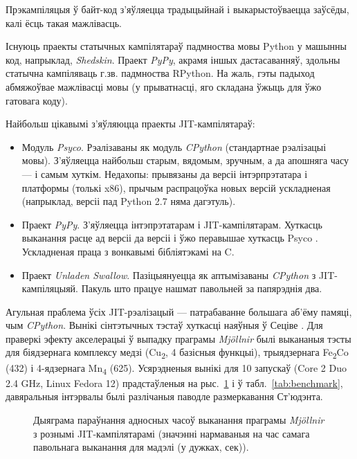 \documentclass[a4paper,12pt]{article}
\newcommand{\progname}{\textit} %
\begin{document}
Прэкампіляцыя ў байт-код з'яўляецца традыцыйнай і выкарыстоўваецца заўсёды, калі ёсць такая мажлівасць.

Існуюць праекты статычных кампілятараў падмноства мовы Python у машынны код, напрыклад, \progname{Shedskin}. Праект \progname{PyPy}, акрамя іншых дастасаванняў, здольны статычна кампіляваць г.зв. падмноства RPython. На жаль, гэты падыход абмяжоўвае мажлівасці мовы (у прыватнасці, яго складана ўжыць для ўжо гатовага коду).

Найбольш цікавымі з'яўляюцца праекты JIT-кампілятараў:
\begin{itemize}
\item Модуль \progname{Psyco}. Рэалізаваны як модуль \progname{CPython} (стандартнае рэалізацыі мовы). З'яўляецца найбольш старым, вядомым, зручным, а да апошняга часу --- і самым хуткім. Недахопы: прывязаны да версіі інтэрпрэтатара і платформы (толькі x86), прычым распрацоўка новых версій ускладненая (напрыклад, версіі пад Python 2.7 няма дагэтуль).

\item Праект \progname{PyPy}. З'яўляецца інтэпрэтатарам і JIT-кампілятарам. Хуткасць выканання расце ад версіі да версіі і ўжо перавышае хуткасць Psyco \cite{speed}. Ускладненая праца з вонкавымі бібліятэкамі на C.

\item Праект \progname{Unladen Swallow}. Пазіцыянуецца як аптымізаваны \progname{CPython} з JIT-кампіляцыяй. Пакуль што працуе нашмат павольней за папярэднія два.
\end{itemize}

Агульная праблема ўсіх JIT-рэалізацый --- патрабаванне большага аб'ёму памяці, чым \progname{CPython}.
Вынікі сінтэтычных тэстаў хуткасці наяўныя ў Сеціве \cite{speed}. Для праверкі эфекту акселерацыі ў выпадку праграмы \progname{Mj{\"o}llnir} былі выкананыя тэсты для біядзернага комплексу медзі (Cu\textsubscript{2}, 4 базісныя функцыі), трыядзернага Fe\textsubscript{2}Co (432) і 4-ядзернага Mn\textsubscript{4} (625). Усярэдненыя вынікі для 10 запускаў (Core 2 Duo 2.4 GHz, Linux Fedora 12) прадстаўленыя на рыс.~\ref{pic:benchmark} і ў табл.~\ref{tab:benchmark}, давяральныя інтэрвалы былі разлічаныя паводле размеркавання Ст'юдэнта.

\begin{figure}[ht]
\caption{Дыяграма параўнання адносных часоў выканання праграмы \progname{Mj{\"o}llnir} з рознымі JIT-кампілятарамі (значэнні нармаваныя на час самага павольнага выканання для мадэлі (у дужках, сек)).}
\label{pic:benchmark}
\end{figure}
\end{document}

